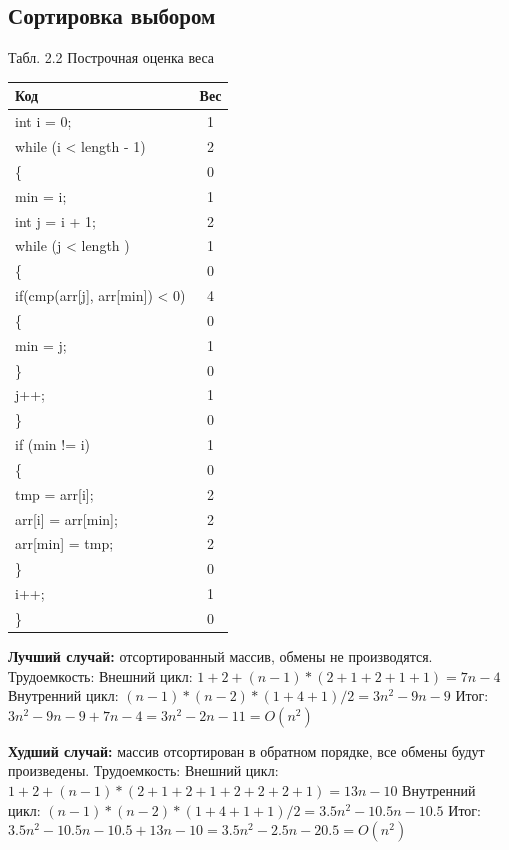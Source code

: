 \documentclass{report}
\begin{document}
\subsection{Сортировка выбором}
\begin{center}
Табл. 2.2 Построчная оценка веса
	\begin{tabular}{|l c|} 
 	\hline
	Код & Вес \\ [0.5ex] 
 	\hline
	int i = 0; & 1\\
 	\hline
	while (i < length - 1) & 2\\
	\hline
	\{ & 0\\
	\hline
	min = i; & 1\\
	\hline
	int j = i + 1; & 2\\
 	\hline
	while (j < length ) & 1\\
	\hline
	\{ & 0\\	
	\hline
	if(cmp(arr[j], arr[min]) < 0) & 4\\
	\hline
	\{ & 0\\
    \hline
    min = j; & 1\\
    \hline
    \} & 0\\
	\hline
	j++; & 1\\
	\hline
	\} & 0\\
	\hline
	if (min != i) & 1\\
	\hline
	\{ & 0\\
	\hline
	tmp = arr[i]; & 2\\
	\hline
    arr[i] = arr[min]; & 2\\
    \hline
    arr[min] = tmp; & 2\\
    \hline
	\} & 0\\
	\hline
	i++; & 1\\
	\hline
	\} & 0\\
	\hline
	\end{tabular}
\end{center}
\hspace*{5mm}
\textbf{Лучший случай:} отсортированный массив, обмены не производятся.
\newline
Трудоемкость: 
\newline
Внешний цикл: $1 + 2 + (n - 1) * (2 + 1 + 2 + 1 + 1) = 7n - 4$
\newline
Внутренний цикл: $(n - 1) * (n - 2) * (1 + 4 + 1) / 2 = 3n^2 -9n -9$
\newline
Итог: $3n^2 -9n -9 + 7n - 4 = 3n^2 -2n - 11 = O(n^2)$
\newline

\textbf{Худший случай:} массив отсортирован в обратном порядке, все обмены будут произведены. \newline
Трудоемкость: 
\newline
Внешний цикл: $1 + 2 + (n - 1) * (2 + 1 + 2 + 1 + 2 + 2 + 2 + 1) = 13n - 10$
\newline
Внутренний цикл: $(n - 1) * (n - 2) * (1 + 4 + 1 + 1) / 2 = 3.5n^2 -10.5n -10.5$
\newline
Итог: $3.5n^2 -10.5n -10.5 + 13n - 10 = 3.5n^2 -2.5n - 20.5 = O(n^2)$
\end{document}
